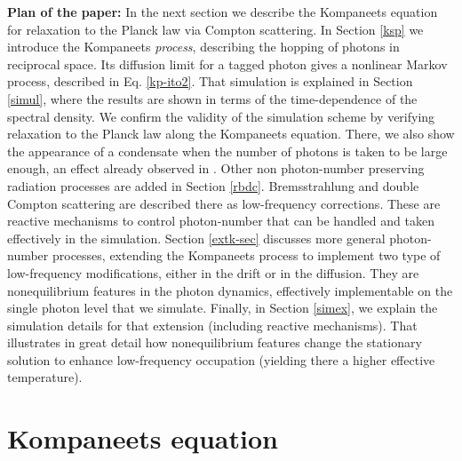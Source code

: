 \documentclass[a4paper,12pt,reqno,superscriptaddress,nofootinbib]{revtex4}
\theoremstyle{plain}
\theoremstyle{definition}
\theoremstyle{remark}
\newcommand{\0}{^{(0)}}
\newcommand{\1}{^{(1)}}
\newcommand{\2}{^{(2)}}
\begin{document}
\textbf{Plan of the paper:}  In the next section we describe the Kompaneets equation for relaxation to the Planck law via Compton scattering.  In Section \ref{ksp} we introduce the Kompaneets {\it process}, describing the hopping of photons in reciprocal space.  Its diffusion limit for a tagged photon gives a nonlinear Markov process, described in Eq. \eqref{kp-ito2}.   That simulation is explained in Section \ref{simul}, where the results are shown in terms of the time-dependence of the spectral density. We confirm the validity of the simulation scheme by verifying relaxation to the Planck law along the Kompaneets equation. There, we also show the appearance of a condensate when the number of photons is taken to be large enough, an effect already observed in \cite{levermore}. Other non photon-number preserving radiation processes are added in Section 
\ref{rbdc}. Bremsstrahlung and double Compton scattering are described there as low-frequency corrections. These are reactive mechanisms to control photon-number that can be handled and taken effectively in the simulation.   Section \ref{extk-sec} discusses more general photon-number processes, extending the Kompaneets process to implement two type of low-frequency modifications, either in the drift or in the diffusion. They are nonequilibrium features in the photon dynamics, effectively implementable on the single photon level that we simulate. Finally, in Section \ref{simex}, we explain the simulation details for that extension (including reactive mechanisms). That illustrates in great detail how nonequilibrium features change the stationary solution to enhance low-frequency occupation (yielding there a higher effective temperature). 






\section{Kompaneets equation}
\end{document}
